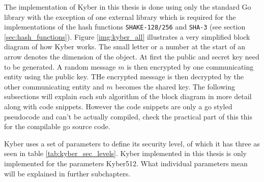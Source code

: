 The implementation of Kyber in this thesis is done using only the standard Go library with the exception of one external library \cite{00fV2cvg7Z6H2tS3} which is required for the implementations of the hash functions \texttt{SHAKE-128/256} and \texttt{SHA-3} (see section \ref{sec:hash_functions}). Figure \ref{img:kyber_all} illustrates a very simplified block diagram of how Kyber works. The small letter or a number at the start of an arrow denotes the dimension of the object. At first the public and secret key need to be generated. A random message $m$ is then encrypted by one communicating entity using the public key. THe encrypted message is then decrypted by the other communicating entity and $m$ becomes the shared key. The following subsections will explain each sub algorithm of the block diagram in more detail along with code snippets. However the code snippets are only a go styled pseudocode and can't be actually compiled, check the practical part of this this for the compilable go source code.

Kyber uses a set of parameters to define its security level, of which it has three as seen in table \ref{tab:kyber_sec_levels}. Kyber implemented in this thesis is only implemented for the parameters Kyber512. What individual parameters mean will be explained in further subchapters.

